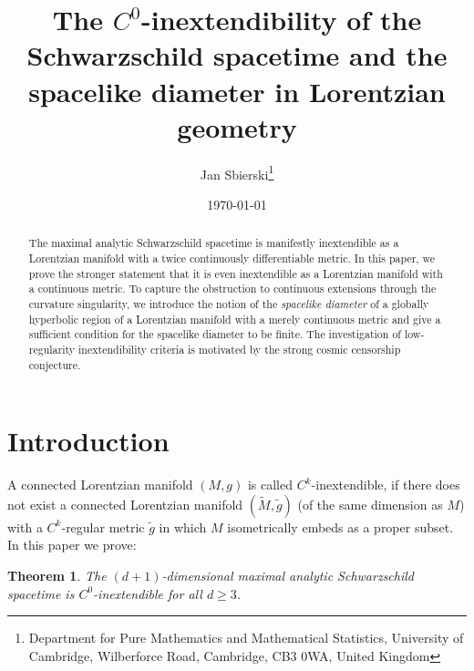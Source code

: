 \documentclass[reqno]{article}
\begin{document}
\newtheorem{theorem}[equation]{Theorem}
\newtheorem{remark}[equation]{Remark}
\newtheorem{claim}[equation]{Claim}
\newtheorem{lemma}[equation]{Lemma}
\newtheorem{definition}[equation]{Definition}
\newtheorem{premiss}[equation]{Premiss}
\newtheorem{corollary}[equation]{Corollary}
\newtheorem{proposition}[equation]{Proposition}
\newtheorem*{theorem*}{Theorem}





\title{The $C^0$-inextendibility of the Schwarzschild spacetime and the spacelike diameter in Lorentzian geometry}
\author{Jan Sbierski\thanks{Department for Pure Mathematics and Mathematical Statistics, University of Cambridge,
Wilberforce Road,
Cambridge,
CB3 0WA,
United Kingdom}}
\date{\today}








\maketitle

\begin{abstract}
The maximal analytic Schwarzschild spacetime is manifestly inextendible as a Lorentzian manifold with a twice continuously differentiable metric. 
In this paper, we prove the stronger statement that it is even inextendible as a Lorentzian manifold with a continuous metric. To capture the obstruction to continuous extensions through the curvature singularity, we introduce the notion of the \emph{spacelike diameter} of a globally hyperbolic region of a Lorentzian manifold with a merely continuous metric and give a sufficient condition for the spacelike diameter to be finite. 
The investigation of low-regularity inextendibility criteria is motivated by the strong cosmic censorship conjecture.
\end{abstract}

\tableofcontents

\restoregeometry
\section{Introduction}


A connected Lorentzian manifold $(M,g)$ is called $C^k$-inextendible, if there does not exist a connected Lorentzian manifold $(\tilde{M}, \tilde{g})$ (of the same dimension as $M$) with a $C^k$-regular metric $\tilde{g}$ in which $M$ isometrically embeds as a proper subset.
In this paper we prove:
\begin{theorem*}
The $(d+1)$-dimensional maximal analytic Schwarzschild spacetime is $C^0$-inextendible for all $d \geq 3$.
\end{theorem*} 
\end{document}
